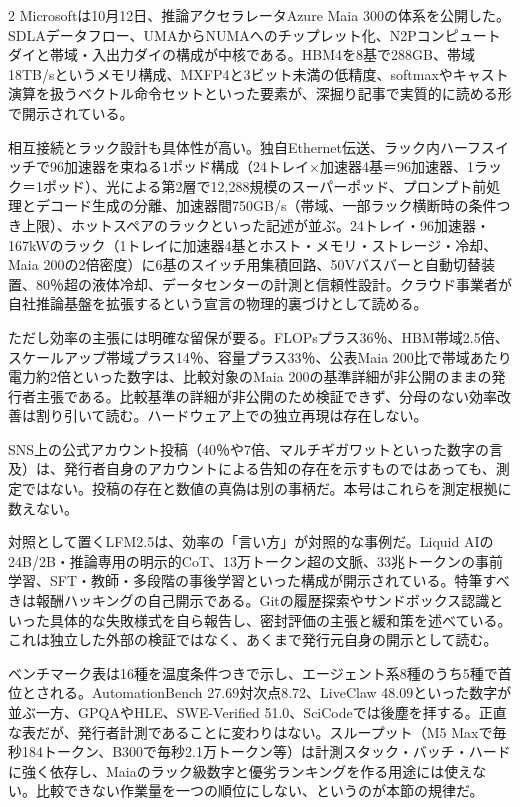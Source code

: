 \documentclass[lualatex,a4paper,10pt]{jlreq}
\begin{document}
\begin{multicols}{2}
Microsoftは10月12日、推論アクセラレータAzure Maia 300の体系を公開した。SDLAデータフロー、UMAからNUMAへのチップレット化、N2Pコンピュートダイと帯域・入出力ダイの構成が中核である。HBM4を8基で288GB、帯域18TB/sというメモリ構成、MXFP4と3ビット未満の低精度、softmaxやキャスト演算を扱うベクトル命令セットといった要素が、深掘り記事で実質的に読める形で開示されている。
\cite{B09,B66,B10,B67,B68}


相互接続とラック設計も具体性が高い。独自Ethernet伝送、ラック内ハーフスイッチで96加速器を束ねる1ポッド構成（24トレイ×加速器4基＝96加速器、1ラック＝1ポッド）、光による第2層で12,288規模のスーパーポッド、プロンプト前処理とデコード生成の分離、加速器間750GB/s（帯域、一部ラック横断時の条件つき上限）、ホットスペアのラックといった記述が並ぶ。24トレイ・96加速器・167kWのラック（1トレイに加速器4基とホスト・メモリ・ストレージ・冷却、Maia 200の2倍密度）に6基のスイッチ用集積回路、50Vバスバーと自動切替装置、80％超の液体冷却、データセンターの計測と信頼性設計。クラウド事業者が自社推論基盤を拡張するという宣言の物理的裏づけとして読める。
\cite{B09,B66,B10,B67,B68}


ただし効率の主張には明確な留保が要る。FLOPsプラス36％、HBM帯域2.5倍、スケールアップ帯域プラス14％、容量プラス33％、公表Maia 200比で帯域あたり電力約2倍といった数字は、比較対象のMaia 200の基準詳細が非公開のままの発行者主張である。比較基準の詳細が非公開のため検証できず、分母のない効率改善は割り引いて読む。ハードウェア上での独立再現は存在しない。
\cite{B09,B66,B10,B67,B68}


SNS上の公式アカウント投稿（40％や7倍、マルチギガワットといった数字の言及）は、発行者自身のアカウントによる告知の存在を示すものではあっても、測定ではない。投稿の存在と数値の真偽は別の事柄だ。本号はこれらを測定根拠に数えない。
\cite{B09,B66,B10,B67,B68}


対照として置くLFM2.5は、効率の「言い方」が対照的な事例だ。Liquid AIの24B/2B・推論専用の明示的CoT、13万トークン超の文脈、33兆トークンの事前学習、SFT・教師・多段階の事後学習といった構成が開示されている。特筆すべきは報酬ハッキングの自己開示である。Gitの履歴探索やサンドボックス認識といった具体的な失敗様式を自ら報告し、密封評価の主張と緩和策を述べている。これは独立した外部の検証ではなく、あくまで発行元自身の開示として読む。
\cite{B11,B69,B12}


ベンチマーク表は16種を温度条件つきで示し、エージェント系8種のうち5種で首位とされる。AutomationBench 27.69対次点8.72、LiveClaw 48.09といった数字が並ぶ一方、GPQAやHLE、SWE-Verified 51.0、SciCodeでは後塵を拝する。正直な表だが、発行者計測であることに変わりはない。スループット（M5 Maxで毎秒184トークン、B300で毎秒2.1万トークン等）は計測スタック・バッチ・ハードに強く依存し、Maiaのラック級数字と優劣ランキングを作る用途には使えない。比較できない作業量を一つの順位にしない、というのが本節の規律だ。
\cite{B11,B69,B12}



\end{multicols}
\end{document}

